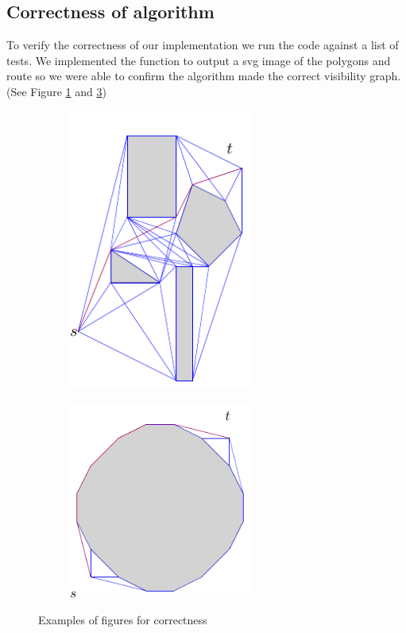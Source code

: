\subsection{Correctness of algorithm}
To verify the correctness of our implementation we run the code against a list of tests.
We implemented the function to output a svg image of the polygons and route so we
were able to confirm the algorithm made the correct visibility graph. (See
Figure \ref{fig:correctness_1} and \ref{fig:correctness_2})
\begin{figure}[H]
	\begin{subfigure}{.5\textwidth}
		\includegraphics[width=6cm]{figures/correctness1.pdf}
		\caption{}
		\label{fig:correctness_1}
	\end{subfigure}
	\begin{subfigure}{.5\textwidth}
		\includegraphics[width=6cm]{figures/correctness2.pdf}
		\caption{}
		\label{fig:correctness_2}
	\end{subfigure}
	\caption{Examples of figures for correctness}
\end{figure}

